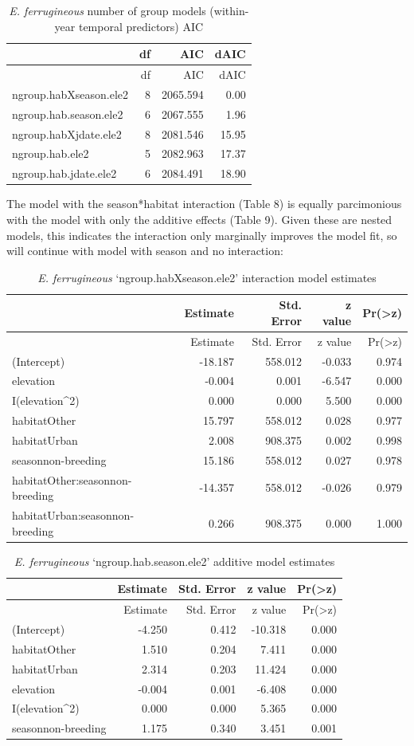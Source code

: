 \documentclass[]{article}
\begin{document}
\begin{longtable}[]{@{}lrrr@{}}
\caption{\textit{E. ferrugineous} number of group models (within-year
temporal predictors) AIC}\tabularnewline
\toprule
& df & AIC & dAIC\tabularnewline
\midrule
\endfirsthead
\toprule
& df & AIC & dAIC\tabularnewline
\midrule
\endhead
ngroup.habXseason.ele2 & 8 & 2065.594 & 0.00\tabularnewline
ngroup.hab.season.ele2 & 6 & 2067.555 & 1.96\tabularnewline
ngroup.habXjdate.ele2 & 8 & 2081.546 & 15.95\tabularnewline
ngroup.hab.ele2 & 5 & 2082.963 & 17.37\tabularnewline
ngroup.hab.jdate.ele2 & 6 & 2084.491 & 18.90\tabularnewline
\bottomrule
\end{longtable}

The model with the season*habitat interaction (Table 8) is equally
parcimonious with the model with only the additive effects (Table 9).
Given these are nested models, this indicates the interaction only
marginally improves the model fit, so will continue with model with
season and no interaction:

\begin{longtable}[]{@{}lrrrr@{}}
\caption{\textit{E. ferrugineous} `ngroup.habXseason.ele2' interaction
model estimates}\tabularnewline
\toprule
& Estimate & Std. Error & z value &
Pr(\textgreater{}\textbar{}z\textbar{})\tabularnewline
\midrule
\endfirsthead
\toprule
& Estimate & Std. Error & z value &
Pr(\textgreater{}\textbar{}z\textbar{})\tabularnewline
\midrule
\endhead
(Intercept) & -18.187 & 558.012 & -0.033 & 0.974\tabularnewline
elevation & -0.004 & 0.001 & -6.547 & 0.000\tabularnewline
I(elevation\^{}2) & 0.000 & 0.000 & 5.500 & 0.000\tabularnewline
habitatOther & 15.797 & 558.012 & 0.028 & 0.977\tabularnewline
habitatUrban & 2.008 & 908.375 & 0.002 & 0.998\tabularnewline
seasonnon-breeding & 15.186 & 558.012 & 0.027 & 0.978\tabularnewline
habitatOther:seasonnon-breeding & -14.357 & 558.012 & -0.026 &
0.979\tabularnewline
habitatUrban:seasonnon-breeding & 0.266 & 908.375 & 0.000 &
1.000\tabularnewline
\bottomrule
\end{longtable}

\begin{longtable}[]{@{}lrrrr@{}}
\caption{\textit{E. ferrugineous} `ngroup.hab.season.ele2' additive
model estimates}\tabularnewline
\toprule
& Estimate & Std. Error & z value &
Pr(\textgreater{}\textbar{}z\textbar{})\tabularnewline
\midrule
\endfirsthead
\toprule
& Estimate & Std. Error & z value &
Pr(\textgreater{}\textbar{}z\textbar{})\tabularnewline
\midrule
\endhead
(Intercept) & -4.250 & 0.412 & -10.318 & 0.000\tabularnewline
habitatOther & 1.510 & 0.204 & 7.411 & 0.000\tabularnewline
habitatUrban & 2.314 & 0.203 & 11.424 & 0.000\tabularnewline
elevation & -0.004 & 0.001 & -6.408 & 0.000\tabularnewline
I(elevation\^{}2) & 0.000 & 0.000 & 5.365 & 0.000\tabularnewline
seasonnon-breeding & 1.175 & 0.340 & 3.451 & 0.001\tabularnewline
\bottomrule
\end{longtable}
\end{document}
